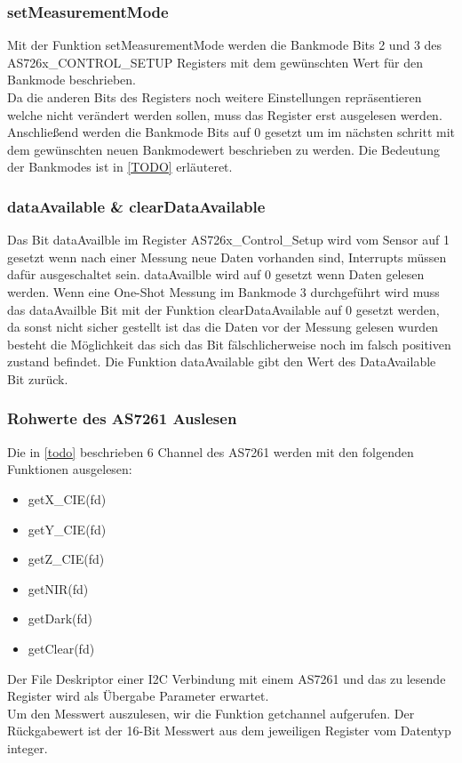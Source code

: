 \subsubsection{setMeasurementMode}
Mit der Funktion setMeasurementMode werden die Bankmode Bits 2 und 3 des \\
AS726x\_CONTROL\_SETUP Registers mit dem gewünschten Wert für den Bankmode beschrieben.\\
Da die anderen Bits des Registers noch weitere Einstellungen repräsentieren welche nicht verändert werden sollen, muss das Register erst ausgelesen werden.
Anschließend werden die Bankmode Bits auf 0 gesetzt um im nächsten schritt mit dem gewünschten neuen Bankmodewert beschrieben zu werden. 
Die Bedeutung der Bankmodes ist in \ref{TODO} erläuteret.

\subsubsection{dataAvailable \& clearDataAvailable}
Das Bit dataAvailble im Register AS726x\_Control\_Setup wird vom Sensor auf 1 gesetzt wenn nach einer Messung neue Daten vorhanden sind, Interrupts müssen dafür ausgeschaltet sein.
dataAvailble wird auf 0 gesetzt wenn Daten gelesen werden.
Wenn eine One-Shot Messung im Bankmode 3 durchgeführt wird muss das dataAvailble Bit mit der Funktion clearDataAvailable auf 0 gesetzt werden, da sonst nicht sicher gestellt ist das die Daten vor der Messung gelesen wurden besteht die Möglichkeit das sich das Bit fälschlicherweise noch im falsch positiven zustand befindet.
Die Funktion dataAvailable gibt den Wert des DataAvailable Bit zurück.

\subsubsection{Rohwerte des AS7261 Auslesen}
Die in \ref{todo} beschrieben 6 Channel des AS7261 werden mit den folgenden Funktionen ausgelesen:
\begin{itemize}
	\item getX\_CIE(fd)
	\item getY\_CIE(fd)
	\item getZ\_CIE(fd)
	\item getNIR(fd)
	\item getDark(fd) 
	\item getClear(fd)
\end{itemize}
Der File Deskriptor einer I2C Verbindung mit einem AS7261 und das zu lesende Register wird als Übergabe Parameter erwartet.\\
Um den Messwert auszulesen, wir die Funktion getchannel aufgerufen.
Der Rückgabewert ist der 16-Bit Messwert aus dem jeweiligen Register vom Datentyp integer.

